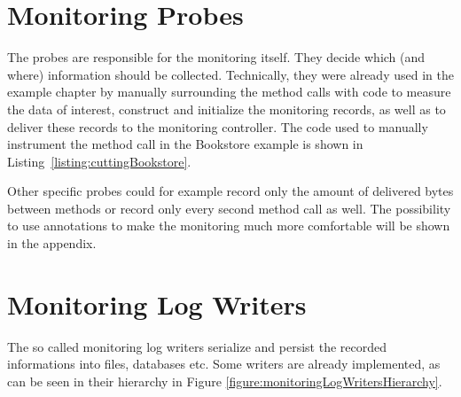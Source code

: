 		\setJavaCodeListing
		


	\section{Monitoring Probes}

The probes are responsible for the monitoring itself. They decide which (and where) information should be collected. Technically, they were already used in the example chapter by manually surrounding the method calls with code to measure the data of interest, %
construct and initialize the monitoring records, as well as to deliver these records to the monitoring controller. %
The code used to manually instrument the method call in the Bookstore example is %
shown in Listing~\ref{listing:cuttingBookstore}. %


		

		\noindent Other specific probes could for example record only the amount of delivered bytes between methods or record only every second method call as well. The possibility to use annotations to make the monitoring much more comfortable will be shown in the appendix.

	\section{Monitoring Log Writers}\label{sec:monitoring-log-writers}

		The so called monitoring log writers serialize and persist the recorded informations into files, databases etc. %
		Some writers are already implemented, as can be seen in their hierarchy in Figure \ref{figure:monitoringLogWritersHierarchy}.

